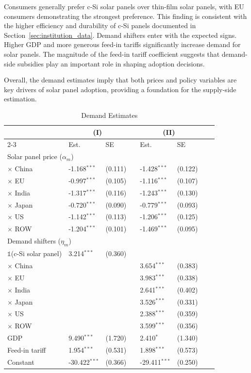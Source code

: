 \documentclass[12pt]{article}
\providecommand{\sym}[1]{\ensuremath{^{#1}}}
\begin{document}
Consumers generally prefer c-Si solar panels over thin-film solar panels, with EU consumers demonstrating the strongest preference. This finding is consistent with the higher efficiency and durability of c-Si panels documented in Section~\ref{sec:institution_data}. 
Demand shifters enter with the expected signs. Higher GDP and more generous feed-in tariffs significantly increase demand for solar panels. The magnitude of the feed-in tariff coefficient suggests that demand-side subsidies play an important role in shaping adoption decisions.

Overall, the demand estimates imply that both prices and policy variables are key drivers of solar panel adoption, providing a foundation for the supply-side estimation.


\begin{table}[tbh]
\centering
\caption{Demand Estimates}
\label{tab:est_demand}
\begin{threeparttable}
\begin{tabularx}{0.85\textwidth}{Xlllllll}
\toprule
 & \multicolumn{2}{c}{(I)}  && \multicolumn{2}{c}{(II)} \\
\cmidrule{2-3} \cmidrule{5-6}
 & Est. & SE   && Est. & SE \\
\midrule
\multicolumn{6}{l}{Solar panel price ($\alpha_m$)} \\
\quad $\times$ China & -1.168\sym{***} & (0.111) && -1.428\sym{***} & (0.122) \\
\quad $\times$ EU     & -0.997\sym{***} & (0.105) && -1.116\sym{***} & (0.107) \\
\quad $\times$ India  & -1.317\sym{***} & (0.116) && -1.243\sym{***} & (0.130) \\
\quad $\times$ Japan  & -0.720\sym{***} & (0.090) && -0.779\sym{***} & (0.093) \\
\quad $\times$ US     & -1.142\sym{***} & (0.113) && -1.206\sym{***} & (0.125) \\
\quad $\times$ ROW    & -1.204\sym{***} & (0.101) && -1.469\sym{***} & (0.095) \\[0.3em]

\multicolumn{6}{l}{Demand shifters ($\eta_m$)} \\
\quad $\mathds{1}$(c-Si solar panel) & 3.214\sym{***} & (0.360) && & \\
\quad\quad $\times$ China & & && 3.654\sym{***} & (0.383) \\
\quad\quad $\times$ EU & & && 3.983\sym{***} & (0.338) \\
\quad\quad $\times$ India & &  && 2.641\sym{***} & (0.402) \\
\quad\quad $\times$ Japan & &  && 3.526\sym{***} & (0.331) \\
\quad\quad $\times$ US & & && 2.388\sym{***} & (0.359) \\
\quad\quad $\times$ ROW & & && 3.599\sym{***} & (0.356) \\
\quad GDP & 9.490\sym{***} & (1.720) && 2.410\sym{*} & (1.340) \\
\quad Feed-in tariff & 1.954\sym{***} & (0.531) && 1.898\sym{***} & (0.573) \\
\quad Constant & -30.422\sym{***} & (0.366)  && -29.411\sym{***} & (0.250) \\


\end{tabularx}
\end{threeparttable}
\end{table}
\end{document}

